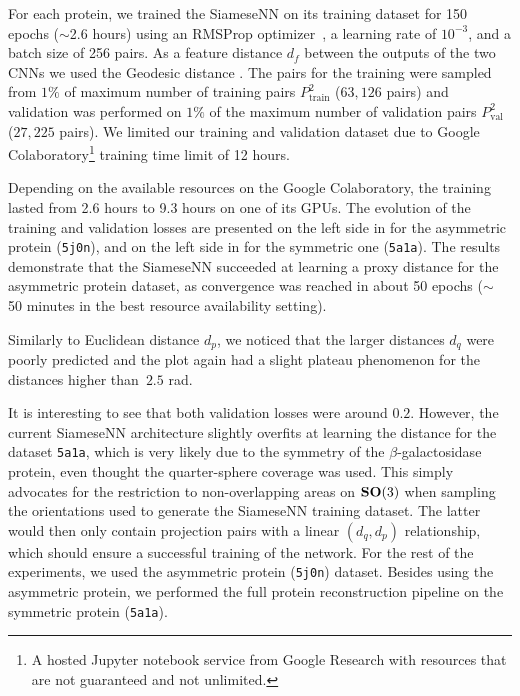 For each protein, we trained the SiameseNN on its training dataset for 150 epochs ($\sim$2.6 hours) using an RMSProp optimizer~\cite{tieleman2012rmsprop}, a learning rate of $10^{-3}$, and a batch size of 256 pairs.
As a feature distance $d_f$ between the outputs of the two CNNs we used the Geodesic distance .
The pairs for the training were sampled from $1\%$ of maximum number of training pairs $P_{\text{train}}^2$ ($63,126$ pairs) and validation was performed on $1\%$ of the maximum number of validation pairs $P_{\text{val}}^2$ ($27,225$ pairs).
We limited our training and validation dataset due to Google Colaboratory\footnote{A hosted Jupyter notebook service from Google Research with resources that are not guaranteed and not unlimited.} training time limit of 12 hours.

Depending on the available resources on the Google Colaboratory, the training lasted from 2.6 hours to 9.3 hours on one of its GPUs.
The evolution of the training and validation losses are presented on the left side in  for the asymmetric protein (\texttt{5j0n}), and on the left side in  for the symmetric one (\texttt{5a1a}).
The results demonstrate that the SiameseNN succeeded at learning a proxy distance for the asymmetric protein dataset, as convergence was reached in about 50 epochs ($\sim$ 50 minutes in the best resource availability setting).

Similarly to Euclidean distance $d_p$, we noticed that the larger distances $d_q$ were poorly predicted and the plot again had a slight plateau phenomenon for the distances higher than~$2.5$ rad.

It is interesting to see that both validation losses were around $0.2$.
However, the current SiameseNN architecture slightly overfits at learning the distance for the dataset \texttt{5a1a}, which is very likely due to the symmetry of the $\beta$-galactosidase protein, even thought the quarter-sphere coverage was used.
This simply advocates for the restriction to non-overlapping areas on $\mathrm{\mathbf{SO}}(3)$ when sampling the orientations used to generate the SiameseNN training dataset.
The latter would then only contain projection pairs with a linear $(d_q,d_p)$ relationship, which should ensure a successful training of the network.
For the rest of the experiments, we used the asymmetric protein (\texttt{5j0n}) dataset.
Besides using the asymmetric protein, we performed the full protein reconstruction pipeline on the symmetric protein (\texttt{5a1a}).

